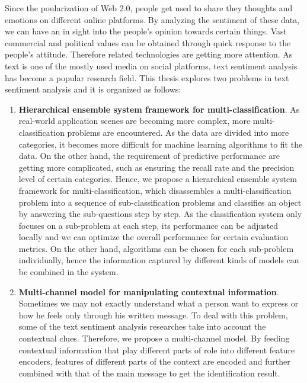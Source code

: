 \begin{eabstract}

Since the poularization of Web 2.0, people get used to share they thoughts and emotions on different online platforms. By analyzing the sentiment of these data, we can have an in sight into the people's opinion towards certain things. Vast commercial and political values can be obtained through quick response to the people's attitude. Therefore related technologies are getting more attention. As text is one of the mostly used media on social platforms, text sentiment analysis has become a popular research field. This thesis explores two problems in text sentiment analysis and it is organized as follows:

\begin{enumerate}

\item {\bf Hierarchical ensemble system framework for multi-classification}. As real-world application scenes are becoming more complex, more multi-classification problems are encountered. As the data are divided into more categories, it becomes more difficult for machine learning algorithms to fit the data. On the other hand, the requirement of predictive performance are getting more complicated, such as ensuring the recall rate and the precision level of certain categories. Hence, we propose a hierarchical ensemble system framework for multi-classification, which disassembles a multi-classification problem into a sequence of sub-classification problems and classifies an object by answering the sub-questions step by step. As the classification system only focuses on a sub-problem at each step, its performance can be adjusted locally and we can optimize the overall performance for certain evaluation metrics. On the other hand, algorithms can be chosen for each sub-problem individually, hence the information captured by different kinds of models can be combined in the system.

\item {\bf Multi-channel model for manipulating contextual information}. Sometimes we may not exactly understand what a person want to express or how he feels only through his written message. To deal with this problem, some of the text sentiment analysis researches take into account the contextual clues. Therefore, we propose a multi-channel model. By feeding contextual information that play different parts of role into different feature encoders, features of different parts of the context are encoded and further combined with that of the main message to get the identification result.


\end{enumerate}
\end{eabstract}
